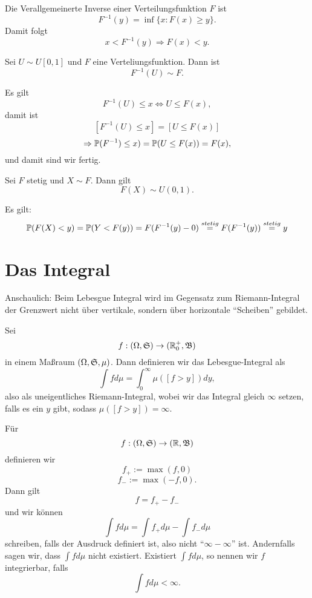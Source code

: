 				\begin{defi}
					Die Verallgemeinerte Inverse einer Verteilungsfunktion $F$ ist 
					\[ F^{-1}(y)=\inf \{x: F(x)\ge y\}. \]
					Damit folgt 
					\[ x<F^{-1}(y)\Rightarrow F(x)<y. \]
				\end{defi}
				
				\begin{satz}
					Sei $U\sim U[0,1]$ und $F$ eine Verteliungsfunktion. Dann ist
					\[ F^{-1}(U)\sim F. \] 
				\end{satz}
				
				\begin{bew}
					Es gilt
					\[ F^{-1}(U)\le x\Leftrightarrow U\le F(x), \]
					damit ist
					\[ [F^{-1}(U)\le x]=[U\le F(x)] \]
					\[ \Rightarrow \P(F^{-1})\le x)=\P(U\le F(x))=F(x), \]
					und damit sind wir fertig. 
				\end{bew}
				
				\begin{satz}
					Sei $F$ stetig und $X\sim F$. Dann gilt
					\[ F(X)\sim U(0,1). \]
				\end{satz}
				
				\begin{bew}
					Es gilt:
					\[ \P(F(X)<y)=\P(Y<F(y))=F(F^{-1}(y)-0)\stackrel{stetig}{=}F(F^{-1}(y))\stackrel{stetig}{=}y \]
				\end{bew}
				
		\section{Das Integral}
			Anschaulich: Beim Lebesgue Integral wird im Gegensatz zum Riemann-Integral der Grenzwert nicht über vertikale, sondern über horizontale "`Scheiben"' gebildet. 
			\begin{defi}
				Sei 
				\[ f:(\Omega,\mf{S})\to (\R_0^+, \mf{B}) \]
				in einem Maßraum $(\Omega, \mf{S}, \mu)$. Dann definieren wir das Lebesgue-Integral als
				\[ \int fd\mu=\int_0^\infty \mu([f>y])dy, \]
				also als uneigentliches Riemann-Integral, wobei wir das Integral gleich $\infty$ setzen, falls es ein $y$ gibt, sodass $\mu([f>y])=\infty$. 
			\end{defi}
			
			\begin{defi}[Allgemeiner]
				Für
				\[ f:(\Omega,\mf{S})\to (\R, \mf{B}) \]
				definieren wir 
				\[ f_+:=\max (f,0) \]
				\[ f_-:=\max(-f,0). \]
				Dann gilt 
				\[ f=f_+-f_- \]
				und wir können 
				\[ \int fd\mu=\int f_+d\mu-\int f_-d\mu \]
				schreiben, falls der Ausdruck definiert ist, also nicht "`$\infty-\infty$"' ist. Andernfalls sagen wir, dass $\int f d\mu$ nicht existiert. Existiert $\int fd\mu$, so nennen wir $f$ integrierbar, falls 
				\[ \int fd\mu<\infty. \] 
			\end{defi}
			
